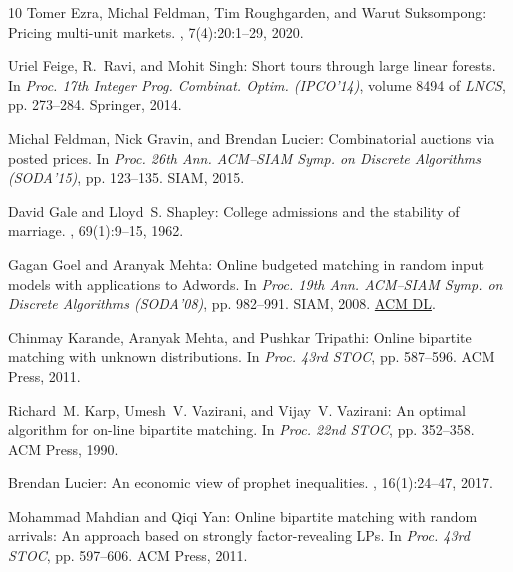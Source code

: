 \begin{thebibliography}{10}
{\sc Tomer Ezra, Michal Feldman, Tim Roughgarden, and Warut Suksompong}:
  Pricing multi-unit markets.
, 7(4):20:1--29, 2020.
\newblock [\epfmtdoi{10.1145/3373715}]

{\sc Uriel Feige, R.~Ravi, and Mohit Singh}: Short tours through large linear
  forests.
\newblock In {\em Proc. 17th Integer Prog. Combinat. Optim. (IPCO'14)}, volume
  8494 of {\em LNCS}, pp. 273--284. Springer, 2014.
\newblock [\epfmtdoi{10.1007/978-3-319-07557-0\_23}]

{\sc Michal Feldman, Nick Gravin, and Brendan Lucier}: Combinatorial auctions
  via posted prices.
\newblock In {\em Proc. 26th Ann. ACM--SIAM Symp. on Discrete Algorithms
  (SODA'15)}, pp. 123--135. SIAM, 2015.
\newblock [\epfmtdoi{10.1137/1.9781611973730.10}]

{\sc David Gale and Lloyd~S. Shapley}: College admissions and the stability of
  marriage.
, 69(1):9--15, 1962.
\newblock [\epfmtdoi{10.2307/2312726}]

{\sc Gagan Goel and Aranyak Mehta}: Online budgeted matching in random input
  models with applications to {A}dwords.
\newblock In {\em Proc. 19th Ann. ACM--SIAM Symp. on Discrete Algorithms
  (SODA'08)}, pp. 982--991. SIAM, 2008.
\newblock \href{https://dl.acm.org/doi/10.5555/1347082.1347189}{ACM DL}.

{\sc Chinmay Karande, Aranyak Mehta, and Pushkar Tripathi}: Online bipartite
  matching with unknown distributions.
\newblock In {\em Proc. 43rd STOC}, pp. 587--596. ACM Press, 2011.
\newblock [\epfmtdoi{10.1145/1993636.1993715}]

{\sc Richard~M. Karp, Umesh~V. Vazirani, and Vijay~V. Vazirani}: An optimal
  algorithm for on-line bipartite matching.
\newblock In {\em Proc. 22nd STOC}, pp. 352--358. ACM Press, 1990.
\newblock [\epfmtdoi{10.1145/100216.100262}]

{\sc Brendan Lucier}: An economic view of prophet inequalities.
, 16(1):24--47, 2017.
\newblock [\epfmtdoi{10.1145/3144722.3144725}]

{\sc Mohammad Mahdian and Qiqi Yan}: Online bipartite matching with random
  arrivals: {A}n approach based on strongly factor-revealing {LP}s.
\newblock In {\em Proc. 43rd STOC}, pp. 597--606. ACM Press, 2011.
\newblock [\epfmtdoi{10.1145/1993636.1993716}]


\end{thebibliography}
